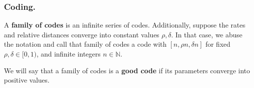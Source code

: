 \documentclass[usenames, aspectratio=169]{beamer}
\begin{document}
\begin{frame}
  \frametitle{ Coding. }
\begin{definition} 
  A \textbf{family of codes} is an infinite series of codes. Additionally, suppose the rates and relative distances converge into constant values $\rho,\delta$. In that case, we abuse the notation and call that family of codes a code with $[n, \rho n, \delta n]$ for fixed $\rho, \delta\in [ 0,1 )$, and infinite integers $n \in \mathbb{N}$.     
  \end{definition}
\begin{definition} 
  We will say that a family of codes is a \textbf{good code} if its parameters converge into positive values. 
  \end{definition}
\end{frame} 
\end{document}
